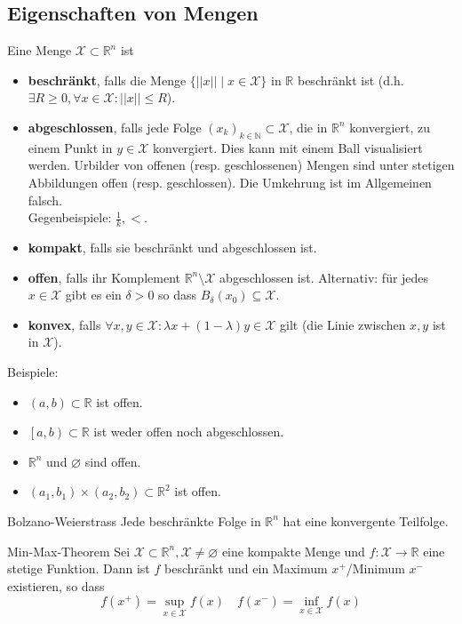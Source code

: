 \documentclass[a4paper,10pt]{article}
\def\R{\mathbb{R}}
\def\N{\mathbb{N}}
\def\X{\mathcal{X}}
\begin{document}
\subsection{Eigenschaften von Mengen}
Eine Menge \(\X \subset \R^n \) ist
\begin{itemize}
  \item \textbf{beschränkt}, falls die Menge \(\{ ||x|| \mid x \in \X \}\) in \(\R\) beschränkt ist (d.h. \(\exists R \ge 0, \forall x \in \X: ||x|| \le R\)).
  \item \textbf{abgeschlossen}, falls jede Folge \((x_k)_{k\in \N} \subset \X\), die in \(\R^n\) konvergiert, zu einem Punkt in \(y \in \X\) konvergiert. Dies kann mit einem Ball visualisiert werden. Urbilder von offenen (resp. geschlossenen) Mengen sind unter stetigen Abbildungen offen (resp. geschlossen). Die Umkehrung ist im Allgemeinen falsch.\\
  Gegenbeispiele: \(\frac{1}{k}, <\).
  \item \textbf{kompakt}, falls sie beschränkt und abgeschlossen ist.
  \item \textbf{offen}, falls ihr Komplement \(\R^n \setminus \X\) abgeschlossen ist. Alternativ: für jedes $x \in \X$ gibt es ein $\delta > 0$ so dass $B_\delta(x_0) \subseteq \X$.
  \item \textbf{konvex}, falls \(\forall x, y \in \X: \lambda x + (1 - \lambda)y \in \X\) gilt (die Linie zwischen \(x, y\) ist in \(\X\)).
\end{itemize}
Beispiele:
\begin{itemize}
  \item \((a,b) \subset \R\) ist offen.
  \item \(\left[a,b\right) \subset \R\) ist weder offen noch abgeschlossen.
  \item \(\R^n\) und \(\varnothing\) sind offen.
  \item \((a_1, b_1) \times (a_2,b_2) \subset \R^2\) ist offen.
\end{itemize}
\begin{subbox}{Bolzano-Weierstrass}
  Jede beschränkte Folge in \(\R^n\) hat eine konvergente Teilfolge.
\end{subbox}
\begin{subbox}{Min-Max-Theorem}
  Sei \(\X \subset \R^n, \X \ne \varnothing\) eine kompakte Menge und \(f: \X \to \R\) eine stetige Funktion. Dann ist \(f\) beschränkt und ein Maximum \(x^+\)/Minimum \(x^-\)existieren, so dass
  \[f(x^+) = \sup_{x\in \X} f(x) \quad f(x^-) = \inf_{x \in \X} f(x)\]
\end{subbox}
\end{document}
